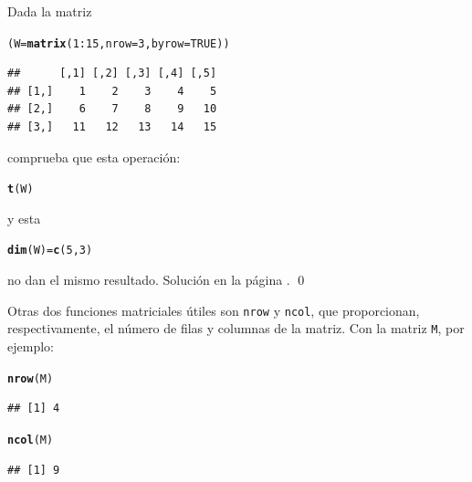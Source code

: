 \documentclass[10pt,a4paper]{article}\usepackage[]{graphicx}\usepackage[]{color}
\makeatletter
\newcommand{\hlnum}[1]{\textcolor[rgb]{0.686,0.059,0.569}{#1}}%
\newcommand{\hlopt}[1]{\textcolor[rgb]{0,0,0}{#1}}%
\newcommand{\hlstd}[1]{\textcolor[rgb]{0.345,0.345,0.345}{#1}}%
\newcommand{\hlkwb}[1]{\textcolor[rgb]{0.69,0.353,0.396}{#1}}%
\newcommand{\hlkwc}[1]{\textcolor[rgb]{0.333,0.667,0.333}{#1}}%
\newcommand{\hlkwd}[1]{\textcolor[rgb]{0.737,0.353,0.396}{\textbf{#1}}}%
\newenvironment{kframe}{%
 \def\at@end@of@kframe{}%
 \ifinner\ifhmode%
  \def\at@end@of@kframe{\end{minipage}}%
  \begin{minipage}{\columnwidth}%
 \fi\fi%
 \def\FrameCommand##1{\hskip\@totalleftmargin \hskip-\fboxsep
 \colorbox{shadecolor}{##1}\hskip-\fboxsep
     \hskip-\linewidth \hskip-\@totalleftmargin \hskip\columnwidth}%
 \MakeFramed {\advance\hsize-\width
   \@totalleftmargin\z@ \linewidth\hsize
   \@setminipage}}%
 {\par\unskip\endMakeFramed%
 \at@end@of@kframe}
\newenvironment{knitrout}{}{} %
\makeatother
\begin{document}
\begin{ejercicio}
\label{tut03:ejercicio07}
\quad
Dada la matriz
\begin{knitrout}
\color{fgcolor}\begin{kframe}
\begin{alltt}
    \hlstd{(W} \hlkwb{=} \hlkwd{matrix}\hlstd{(}\hlnum{1}\hlopt{:}\hlnum{15}\hlstd{,} \hlkwc{nrow}\hlstd{=}\hlnum{3}\hlstd{,} \hlkwc{byrow}\hlstd{=}\hlnum{TRUE}\hlstd{))}
\end{alltt}
\begin{verbatim}
##      [,1] [,2] [,3] [,4] [,5]
## [1,]    1    2    3    4    5
## [2,]    6    7    8    9   10
## [3,]   11   12   13   14   15
\end{verbatim}
\end{kframe}
\end{knitrout}
comprueba que esta operación:
\begin{knitrout}
\color{fgcolor}\begin{kframe}
\begin{alltt}
    \hlkwd{t}\hlstd{(W)}
\end{alltt}
\end{kframe}
\end{knitrout}
y esta
\begin{knitrout}
\color{fgcolor}\begin{kframe}
\begin{alltt}
    \hlkwd{dim}\hlstd{(W)} \hlkwb{=} \hlkwd{c}\hlstd{(}\hlnum{5}\hlstd{,}\hlnum{3}\hlstd{)}
\end{alltt}
\end{kframe}
\end{knitrout}
no dan el mismo resultado. Solución en la página \pageref{tut03:ejercicio07:sol}.
\qed
\end{ejercicio}
Otras dos funciones matriciales útiles son {\tt nrow} y {\tt ncol}, que proporcionan, respectivamente, el número de filas y columnas de la matriz. Con la matriz {\tt M}, por ejemplo:
\begin{knitrout}
\color{fgcolor}\begin{kframe}
\begin{alltt}
    \hlkwd{nrow}\hlstd{(M)}
\end{alltt}
\begin{verbatim}
## [1] 4
\end{verbatim}
\begin{alltt}
    \hlkwd{ncol}\hlstd{(M)}
\end{alltt}
\begin{verbatim}
## [1] 9
\end{verbatim}
\end{kframe}
\end{knitrout}
\end{document}
